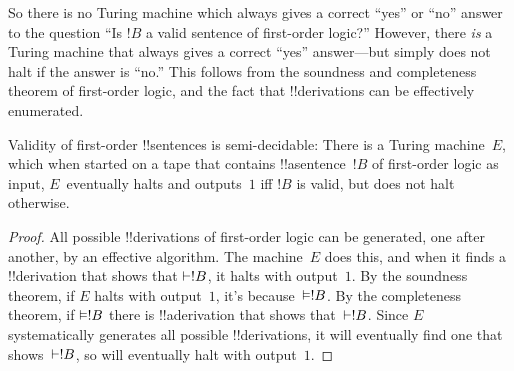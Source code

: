 \documentclass[../../../include/open-logic-section]{subfiles}
\begin{document}
\begin{explain}
So there is no Turing machine which always gives a
correct ``yes'' or ``no'' answer to the question ``Is $!B$ a valid
sentence of first-order logic?'' However, there \emph{is} a Turing
machine that always gives a correct ``yes'' answer---but simply does
not halt if the answer is ``no.'' This follows from the soundness and
completeness theorem of first-order logic, and the fact that
!!{derivation}s can be effectively enumerated.
\end{explain}

\begin{thm}
  Validity of first-order !!{sentence}s is semi-decidable: There is a
  Turing machine~$E$, which when started on a tape that contains
  !!a{sentence}~$!B$ of first-order logic as input, $E$~eventually
  halts and outputs~$1$ iff $!B$ is valid, but does not halt
  otherwise.
\end{thm}

\begin{proof}
  All possible !!{derivation}s of first-order logic can be generated,
  one after another, by an effective algorithm.  The machine~$E$ does
  this, and when it finds a !!{derivation} that shows that $\Proves
  !B$, it halts with output~$1$. By the soundness theorem, if $E$
  halts with output~$1$, it's because~$\Entails !B$. By the
  completeness theorem, if $\Entails !B$ there is !!a{derivation} that
  shows that~$\Proves !B$. Since $E$ systematically generates all
  possible !!{derivation}s, it will eventually find one that
  shows~$\Proves !B$, so will eventually halt with output~$1$.
\end{proof}
\end{document}
